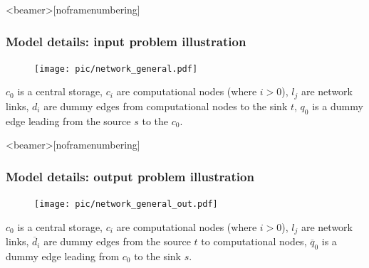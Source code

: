 \documentclass{beamer}
\begin{document}
\begin{frame}<beamer>[noframenumbering]\frametitle{Model details: input problem illustration}
\begin{figure}[h]
	\begin{center}
		\texttt{[image: pic/network\_general.pdf]}
	\end{center}

	\label{network_general}	
\end{figure} 
$c_{0}$ is a central storage, $c_{i}$ are computational nodes (where $i>0$), $l_{j}$ are network links, $d_{i}$ are dummy edges from computational nodes to the sink $t$, $q_{0}$ is a dummy edge leading from the source $s$ to the $c_{0}$. 
\end{frame}

\begin{frame}<beamer>[noframenumbering]\frametitle{Model details: output problem illustration}
\begin{figure}[h]
	\begin{center}
		\texttt{[image: pic/network\_general\_out.pdf]}
	\end{center}

	\label{general_out}	
\end{figure}
	$c_{0}$ is a central storage, $c_{i}$ are computational nodes (where $i>0$), $l_{j}$ are network links, $\overline{d}_{i}$ are dummy edges from the source $t$ to computational nodes, $\overline{q}_{0}$ is a dummy edge leading from $c_{0}$ to the sink $s$.
\end{frame}
\end{document}
